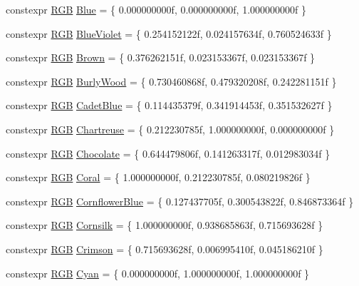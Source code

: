 \begin{DoxyCompactItemize}
\item 
constexpr \hyperlink{structmage_1_1_r_g_b}{R\+GB} \hyperlink{namespacemage_1_1color_af2a2acff5b9725eb57bef7dc4822892b}{Blue} = \{ 0.\+000000000f, 0.\+000000000f, 1.\+000000000f \}
\item 
constexpr \hyperlink{structmage_1_1_r_g_b}{R\+GB} \hyperlink{namespacemage_1_1color_a456981fe1885b8347622a2b63fc27fe0}{Blue\+Violet} = \{ 0.\+254152122f, 0.\+024157634f, 0.\+760524633f \}
\item 
constexpr \hyperlink{structmage_1_1_r_g_b}{R\+GB} \hyperlink{namespacemage_1_1color_ae17f4f7f2abb3b569dcda75a56a6e0fc}{Brown} = \{ 0.\+376262151f, 0.\+023153367f, 0.\+023153367f \}
\item 
constexpr \hyperlink{structmage_1_1_r_g_b}{R\+GB} \hyperlink{namespacemage_1_1color_ad61a0cb85a0718f107d24a9ccb14f7a9}{Burly\+Wood} = \{ 0.\+730460868f, 0.\+479320208f, 0.\+242281151f \}
\item 
constexpr \hyperlink{structmage_1_1_r_g_b}{R\+GB} \hyperlink{namespacemage_1_1color_a9db1c95bad4c8f3a056b2b1b09bd1e90}{Cadet\+Blue} = \{ 0.\+114435379f, 0.\+341914453f, 0.\+351532627f \}
\item 
constexpr \hyperlink{structmage_1_1_r_g_b}{R\+GB} \hyperlink{namespacemage_1_1color_a4d4898d5a83df8e62ac4d1062771f710}{Chartreuse} = \{ 0.\+212230785f, 1.\+000000000f, 0.\+000000000f \}
\item 
constexpr \hyperlink{structmage_1_1_r_g_b}{R\+GB} \hyperlink{namespacemage_1_1color_a19707250aad8c877717355fac97779d6}{Chocolate} = \{ 0.\+644479806f, 0.\+141263317f, 0.\+012983034f \}
\item 
constexpr \hyperlink{structmage_1_1_r_g_b}{R\+GB} \hyperlink{namespacemage_1_1color_a01bc4f2d453366cf9af890f0abb94738}{Coral} = \{ 1.\+000000000f, 0.\+212230785f, 0.\+080219826f \}
\item 
constexpr \hyperlink{structmage_1_1_r_g_b}{R\+GB} \hyperlink{namespacemage_1_1color_a6b4ca119db23d03d1c5bc912c87b6348}{Cornflower\+Blue} = \{ 0.\+127437705f, 0.\+300543822f, 0.\+846873364f \}
\item 
constexpr \hyperlink{structmage_1_1_r_g_b}{R\+GB} \hyperlink{namespacemage_1_1color_ace73c8ed652093ab4cce3af40a8efe1a}{Cornsilk} = \{ 1.\+000000000f, 0.\+938685863f, 0.\+715693628f \}
\item 
constexpr \hyperlink{structmage_1_1_r_g_b}{R\+GB} \hyperlink{namespacemage_1_1color_a3855cb93401fa7336108eac1f9b8c0c7}{Crimson} = \{ 0.\+715693628f, 0.\+006995410f, 0.\+045186210f \}
\item 
constexpr \hyperlink{structmage_1_1_r_g_b}{R\+GB} \hyperlink{namespacemage_1_1color_a2b9093d5d06a4a0421cb602c22deadb5}{Cyan} = \{ 0.\+000000000f, 1.\+000000000f, 1.\+000000000f \}

\end{DoxyCompactItemize}
